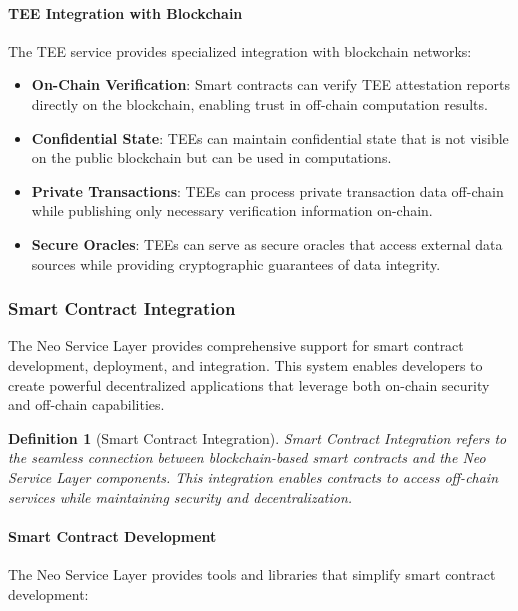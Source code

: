 \documentclass{article}
\newtheorem{definition}{Definition}
\begin{document}
\paragraph{TEE Integration with Blockchain}
The TEE service provides specialized integration with blockchain networks:

\begin{itemize}
    \item \textbf{On-Chain Verification}: Smart contracts can verify TEE attestation reports directly on the blockchain, enabling trust in off-chain computation results.
    
    \item \textbf{Confidential State}: TEEs can maintain confidential state that is not visible on the public blockchain but can be used in computations.
    
    \item \textbf{Private Transactions}: TEEs can process private transaction data off-chain while publishing only necessary verification information on-chain.
    
    \item \textbf{Secure Oracles}: TEEs can serve as secure oracles that access external data sources while providing cryptographic guarantees of data integrity.
\end{itemize}

\subsubsection{Smart Contract Integration}
\label{subsubsec:smart-contract}

The Neo Service Layer provides comprehensive support for smart contract development, deployment, and integration. This system enables developers to create powerful decentralized applications that leverage both on-chain security and off-chain capabilities.



\begin{definition}[Smart Contract Integration]
Smart Contract Integration refers to the seamless connection between blockchain-based smart contracts and the Neo Service Layer components. This integration enables contracts to access off-chain services while maintaining security and decentralization.
\end{definition}

\paragraph{Smart Contract Development}
The Neo Service Layer provides tools and libraries that simplify smart contract development:
\end{document}
